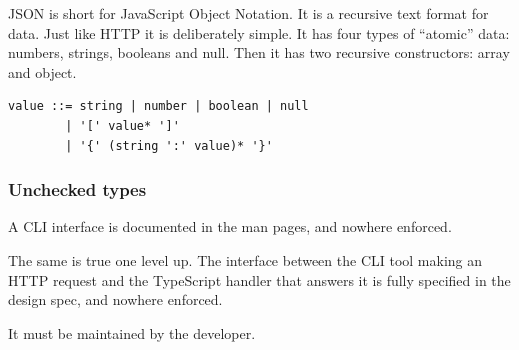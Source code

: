 \documentclass[aspectratio=169,12pt]{beamer}
\begin{document}
\begin{frame}[fragile]
\vfill
\begin{center}
\begin{minipage}{0.92\textwidth}
\raggedright
\large

JSON is short for JavaScript Object Notation. It is a recursive text format for data. Just like
HTTP it is deliberately simple. It has four types of ``atomic'' data: numbers, strings, booleans
and null. Then it has two recursive constructors: array and object.

\medskip

\begin{lstlisting}[basicstyle=\ttfamily\small]
value ::= string | number | boolean | null
        | '[' value* ']'
        | '{' (string ':' value)* '}'
\end{lstlisting}

\end{minipage}
\end{center}
\vfill
\end{frame}

\begin{frame}
\frametitle{Unchecked types}
\vfill
\begin{center}
\begin{minipage}{0.92\textwidth}
\raggedright
\large

A CLI interface is documented in the man pages, and nowhere enforced.

\medskip

The same is true one level up. The interface between the CLI tool making an HTTP request and the
TypeScript handler that answers it is fully specified in the design spec, and nowhere enforced.

\medskip

It must be maintained by the developer.

\end{minipage}
\end{center}
\vfill
\end{frame}
\end{document}
